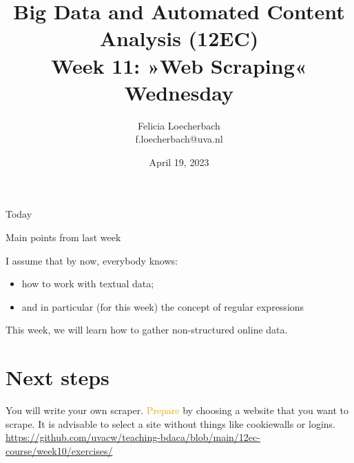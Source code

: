 \documentclass[compress]{beamer}
\begin{document}
\title[Big Data and Automated Content Analysis]{\textbf{Big Data and Automated Content Analysis (12EC)} 
\\Week 11: »Web Scraping«
\\Wednesday}
\author[Felicia Loecherbach]{Felicia Loecherbach\\ \footnotesize{f.loecherbach@uva.nl \\}}
\date{April 19, 2023}


\begin{frame}{}
	\titlepage
\end{frame}

\begin{frame}{Today}
	\tableofcontents
\end{frame}





\begin{frame}{Main points from last week}

\begin{alertblock}{I assume that by now, everybody knows:}
\begin{itemize}
\item how to work with textual data;
\item and in particular (for this week) the concept of regular expressions
\end{itemize}
\end{alertblock}
\end{frame}


\begin{frame}[standout]
This week, we will learn how to gather non-structured online data.
\end{frame}














\section{Next steps}

\begin{frame}[standout]
You will write your own scraper. \textcolor{orange}{Prepare} by choosing a website that you want to scrape. It is advisable to select a site without things like cookiewalls or logins.
\large{\url{https://github.com/uvacw/teaching-bdaca/blob/main/12ec-course/week10/exercises/}}
\end{frame}





\begin{frame}
	\printbibliography
\end{frame}
\end{document}
